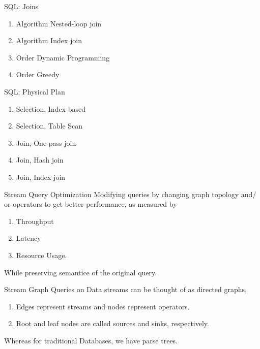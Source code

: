 \begin{frame}{SQL: Joins}
    \begin{enumerate}
        \item Algorithm Nested-loop join
        \item Algorithm Index join
        \item Order Dynamic Programming
        \item Order Greedy
    \end{enumerate}
\end{frame}

\begin{frame}{SQL: Physical Plan}
    \begin{enumerate}
        \item Selection, Index based
        \item Selection, Table Scan
        \item Join, One-pass join
        \item Join, Hash join
        \item Join, Index join
    \end{enumerate}
\end{frame}

\begin{frame}{Stream Query Optimization}
    Modifying queries by changing graph topology and/ or operators to get better performance, as measured by
    \begin{enumerate}
        \item Throughput
        \item Latency
        \item Resource Usage.
    \end{enumerate}
    While preserving semantice of the original query.
\end{frame}

\begin{frame}{Stream Graph}
    Queries on Data streams can be thought of as directed graphs,
    \begin{enumerate}
    \item Edges represent streams and nodes represent operators.
    \item Root  and  leaf nodes are called sources and sinks, respectively.
    \end{enumerate}
    Whereas for traditional Databases, we have parse trees.
\end{frame}

